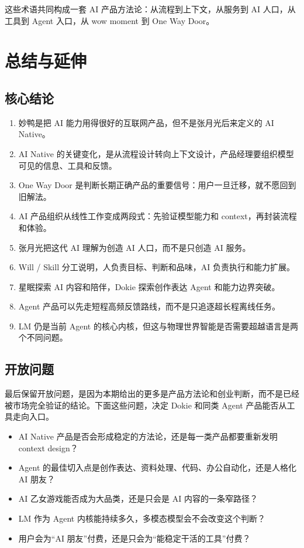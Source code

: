\documentclass[a4paper]{article}
\begin{document}
这些术语共同构成一套 AI 产品方法论：从流程到上下文，从服务到 AI 人口，从工具到 Agent 入口，从 wow moment 到 One Way Door。

\section{总结与延伸}

\subsection{核心结论}

\begin{enumerate}
\item 妙鸭是把 AI 能力用得很好的互联网产品，但不是张月光后来定义的 AI Native。
\item AI Native 的关键变化，是从流程设计转向上下文设计，产品经理要组织模型可见的信息、工具和反馈。
\item One Way Door 是判断长期正确产品的重要信号：用户一旦迁移，就不愿回到旧解法。
\item AI 产品组织从线性工作变成两段式：先验证模型能力和 context，再封装流程和体验。
\item 张月光把这代 AI 理解为创造 AI 人口，而不是只创造 AI 服务。
\item Will / Skill 分工说明，人负责目标、判断和品味，AI 负责执行和能力扩展。
\item 星眠探索 AI 内容和陪伴，Dokie 探索创作表达 Agent 和能力边界突破。
\item Agent 产品可以先走短程高频反馈路线，而不是只追逐超长程离线任务。
\item LM 仍是当前 Agent 的核心内核，但这与物理世界智能是否需要超越语言是两个不同问题。
\end{enumerate}

\subsection{开放问题}

最后保留开放问题，是因为本期给出的更多是产品方法论和创业判断，而不是已经被市场完全验证的结论。下面这些问题，决定 Dokie 和同类 Agent 产品能否从工具走向入口。

\begin{itemize}
\item AI Native 产品是否会形成稳定的方法论，还是每一类产品都要重新发明 context design？
\item Agent 的最佳切入点是创作表达、资料处理、代码、办公自动化，还是人格化 AI 朋友？
\item AI 乙女游戏能否成为大品类，还是只会是 AI 内容的一条窄路径？
\item LM 作为 Agent 内核能持续多久，多模态模型会不会改变这个判断？
\item 用户会为“AI 朋友”付费，还是只会为“能稳定干活的工具”付费？
\end{itemize}
\end{document}
